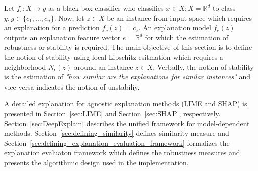 \documentclass[english]{tktltiki2}
\theoremstyle{definition}
\theoremstyle{remark}
\begin{document}
Let $f_c: X \to y$ as a black-box classifier who classifies $x \in X; X = {\mathbb{R}}^d$ to class $y, y \in \{c_1, \dots, c_n\}$. Now, let $z \in X$ be an instance from input space which requires an explanation for a prediction $f_c(z) = c_z$. An explanation model $f_e(z)$ outputs an explanation feature vector $ e = {\mathbb{R}}^d$ for which the estimation of robustness or stability is required. The main objective of this section is to define the notion of stability using local Lipschitz esitmation which requires a neighborhood $N_{\epsilon}(z)$ around an instance $z \in X$. Verbally, the notion of stability is the estimation of \textit{"how similar are the explanations for similar instances"} and vice versa indicates the notion of unstabiliy.

A detailed explanation for agnostic explanation methods (LIME and SHAP) is presented in Section~\ref{sec:LIME} and Section~\ref{sec:SHAP}, respectively. Section~\ref{sec:DeepExplain} describes the unified framework for model-dependent methods. Section~\ref{sec:defining_similarity} defines similarity measure and Section~\ref{sec:defining_explanation_evaluation_framework} formalizes the explanation evaluaton framework which defines the robustness measures and presents the algorithmic design used in the implementation.
\end{document}

